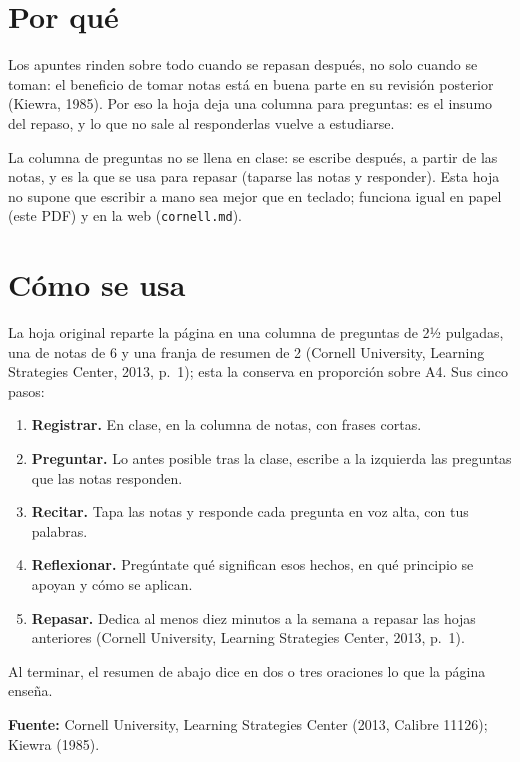 \documentclass{academic-report}
\begin{document}
\newpage
\section*{Por qué}
Los apuntes rinden sobre todo cuando se repasan después, no solo cuando se toman: el
beneficio de tomar notas está en buena parte en su revisión posterior (Kiewra, 1985). Por eso
la hoja deja una columna para preguntas: es el insumo del repaso, y lo que no sale al
responderlas vuelve a estudiarse.

\begin{nota}
La columna de preguntas no se llena en clase: se escribe después, a partir de las notas, y es
la que se usa para repasar (taparse las notas y responder). Esta hoja no supone que escribir a
mano sea mejor que en teclado; funciona igual en papel (este PDF) y en la web (\texttt{cornell.md}).
\end{nota}

\section*{Cómo se usa}
La hoja original reparte la página en una columna de preguntas de 2½ pulgadas, una de notas de
6 y una franja de resumen de 2 (Cornell University, Learning Strategies Center, 2013, p.~1); esta
la conserva en proporción sobre A4. Sus cinco pasos:
\begin{enumerate}
  \item \textbf{Registrar.} En clase, en la columna de notas, con frases cortas.
  \item \textbf{Preguntar.} Lo antes posible tras la clase, escribe a la izquierda las
        preguntas que las notas responden.
  \item \textbf{Recitar.} Tapa las notas y responde cada pregunta en voz alta, con tus palabras.
  \item \textbf{Reflexionar.} Pregúntate qué significan esos hechos, en qué principio se
        apoyan y cómo se aplican.
  \item \textbf{Repasar.} Dedica al menos diez minutos a la semana a repasar las hojas
        anteriores (Cornell University, Learning Strategies Center, 2013, p.~1).
\end{enumerate}
Al terminar, el resumen de abajo dice en dos o tres oraciones lo que la página enseña.

\noindent\textbf{Fuente:} Cornell University, Learning Strategies Center (2013, Calibre 11126);
Kiewra (1985).
\end{document}
